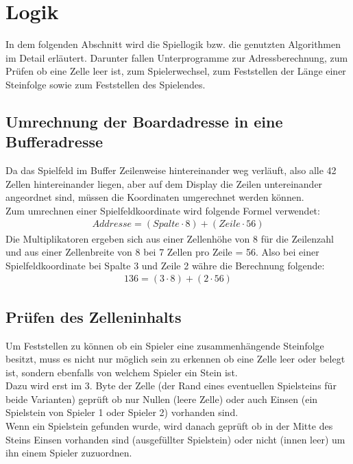 \newpage
\section{Logik}
    In dem folgenden Abschnitt wird die Spiellogik bzw. die genutzten Algorithmen im Detail erläutert.
    Darunter fallen Unterprogramme zur Adressberechnung, zum Prüfen ob eine Zelle leer ist, zum Spielerwechsel,
    zum Feststellen der Länge einer Steinfolge sowie zum Feststellen des Spielendes.

    \subsection{Umrechnung der Boardadresse in eine Bufferadresse}
        Da das Spielfeld im Buffer Zeilenweise hintereinander weg verläuft, also alle 42 Zellen hintereinander liegen,
        aber auf dem Display die Zeilen untereinander angeordnet sind, müssen die Koordinaten umgerechnet werden können.
        \\
        Zum umrechnen einer Spielfeldkoordinate wird folgende Formel verwendet:
        \begin{align}
            Addresse = (Spalte \cdot 8) + (Zeile \cdot 56)
        \end{align}
        Die Multiplikatoren ergeben sich aus einer Zellenhöhe von 8 für die Zeilenzahl und aus einer Zellenbreite von 8 bei 7 Zellen pro Zeile = 56.
        Also bei einer Spielfeldkoordinate bei Spalte 3 und Zeile 2 währe die Berechnung folgende:
        \begin{align}
            136 = (3 \cdot 8) + (2 \cdot 56) 
        \end{align}
        

    \subsection{Prüfen des Zelleninhalts}
        Um Feststellen zu können ob ein Spieler eine zusammenhängende Steinfolge besitzt,
        muss es nicht nur möglich sein zu erkennen ob eine Zelle leer oder belegt ist,
        sondern ebenfalls von welchem Spieler ein Stein ist.
        \\
        Dazu wird erst im 3. Byte der Zelle (der Rand eines eventuellen Spielsteins für beide Varianten)
        geprüft ob nur Nullen (leere Zelle) oder auch Einsen (ein Spielstein von Spieler 1 oder Spieler 2) vorhanden sind.
        \\
        Wenn ein Spielstein gefunden wurde,
        wird danach geprüft ob in der Mitte des Steins Einsen vorhanden sind (ausgefüllter Spielstein) oder nicht (innen leer)
        um ihn einem Spieler zuzuordnen.

